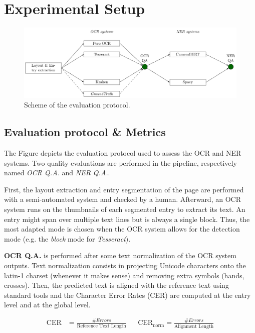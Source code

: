 \section{Experimental Setup}


\begin{figure}[tb]
\includegraphics[width=\linewidth]{figs/protocol.pdf}
\caption{Scheme of the evaluation protocol. }
\label{fig.protocol}
\end{figure}

\subsection{Evaluation protocol \& Metrics}

The Figure  depicts the evaluation protocol used to assess the OCR and NER systems. Two quality evaluations
are performed in the pipeline, respectively named \emph{OCR Q.A.} and \emph{NER Q.A.}.

First, the layout extraction and entry segmentation of the page are performed with a semi-automated system and
checked by a human. Afterward, an OCR system runs on the thumbnails of each segmented entry to extract its text. An
entry might span over multiple text lines but is always a single block. Thus, the most adapted mode is chosen when
the OCR system allows for the detection mode (e.g. the \emph{block} mode for \emph{Tesseract}). 

\textbf{OCR Q.A.} is performed after some text normalization of the OCR system outputs. Text normalization consists in
projecting Unicode characters onto the latin-1 charset (whenever it makes sense) and removing extra symbols (hands,
crosses). Then, the predicted text is aligned with the reference text using standard tools and the Character Error Rates
(CER) are computed at the entry level and at the global level. 

\begin{align}
\mathrm{CER} &=  \frac{\#Errors}{\text{Reference Text Length}} & & \mathrm{CER}_\mathrm{norm} =  \frac{\#Errors}{\text{Alignment Length}} 
\end{align}


